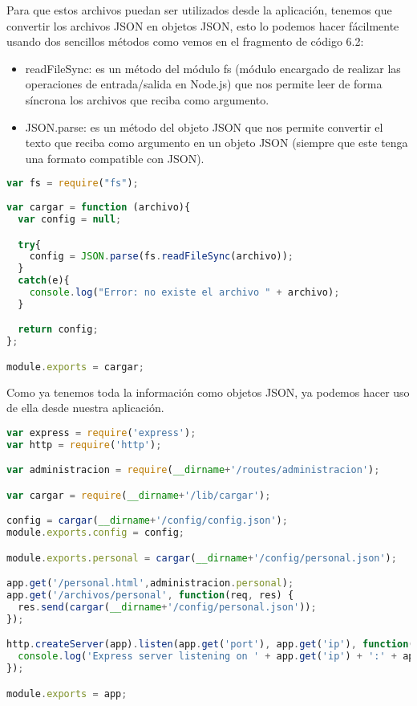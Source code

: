 Para que estos archivos puedan ser utilizados desde la aplicación, tenemos que convertir los archivos JSON en objetos JSON, esto lo podemos hacer fácilmente usando dos sencillos métodos como vemos en el fragmento de código 6.2:

\begin{itemize}
	\item readFileSync: es un método del módulo fs (módulo encargado de realizar las operaciones de entrada/salida en Node.js) que nos permite leer de forma síncrona los archivos que reciba como argumento.
	\item JSON.parse: es un método del objeto JSON que nos permite convertir el texto que reciba como argumento en un objeto JSON (siempre que este tenga una formato compatible con JSON).
\end{itemize}

\begin{lstlisting}[language=javascript,caption={Archivo {\tt cargar.js}},label={lst:cargarjs}]
var fs = require("fs");
 
var cargar = function (archivo){
  var config = null;

  try{
    config = JSON.parse(fs.readFileSync(archivo));
  }
  catch(e){
    console.log("Error: no existe el archivo " + archivo);
  }

  return config;
};

module.exports = cargar;
\end{lstlisting}

\newpage

Como ya tenemos toda la información como objetos JSON, ya podemos hacer uso de ella desde nuestra aplicación.

\begin{lstlisting}[language=javascript,caption={Archivo {\tt app.js}},label={lst:appjs}]
var express = require('express');
var http = require('http');

var administracion = require(__dirname+'/routes/administracion');

var cargar = require(__dirname+'/lib/cargar');

config = cargar(__dirname+'/config/config.json');
module.exports.config = config;

module.exports.personal = cargar(__dirname+'/config/personal.json');

app.get('/personal.html',administracion.personal);
app.get('/archivos/personal', function(req, res) {
  res.send(cargar(__dirname+'/config/personal.json'));
});

http.createServer(app).listen(app.get('port'), app.get('ip'), function(){
  console.log('Express server listening on ' + app.get('ip') + ':' + app.get('port'));
});

module.exports = app;
\end{lstlisting}

